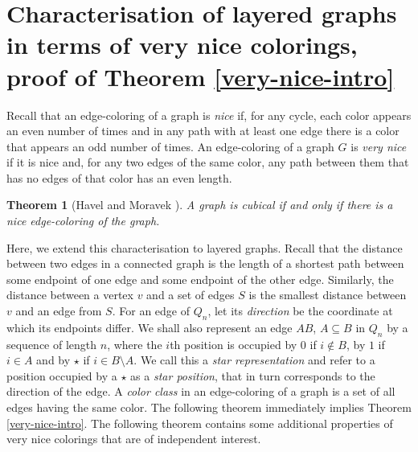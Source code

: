 \documentclass[11pt, a4paper]{article}
\newtheorem{theorem}{Theorem}
\begin{document}
\vskip 1cm




\section{Characterisation of layered graphs in terms of very nice colorings, proof of Theorem \ref{very-nice-intro}}\label{colorings}

	Recall that  an edge-coloring of a graph is {\it nice} if, for any cycle, each color appears an even number of times and in any path with at least one edge there is a color that appears an  odd number of times. An edge-coloring of a graph $G$ is {\it very nice} if  it is nice and, for any two edges of the same color, any path between them that has no edges of that color has an even length. 
	
	\begin{theorem}[Havel and Moravek \cite{HM}]
	A graph is cubical if and only if there is a nice edge-coloring of the graph. 
	\end{theorem}
		
		
	Here, we extend this characterisation to layered graphs. Recall that the distance between two edges in a connected graph is the length of a shortest path between some endpoint of one edge and some endpoint of the other edge. Similarly, the distance between a vertex $v$  and a set of edges $S$ is the smallest distance between $v$ and an edge from $S$. For an edge of $Q_n$, let its {\it direction} be the coordinate at which its endpoints differ.  We shall also represent an edge $AB$, $A\subseteq B$ in $Q_n$ by a sequence of length $n$, 
where the $i$th position is occupied by $0$ if $i\notin B$,  by $1$ if $i\in A$ and by $\star$ if $i\in B\setminus A$.  We call this a \textit{star representation} and refer to a position occupied by a $\star$ as a {\it star position}, that in turn corresponds to the direction of the edge.  A {\it color class} in an edge-coloring of a graph is a set of all edges having the same color. The following theorem immediately implies Theorem \ref{very-nice-intro}. The following theorem contains some additional properties of very nice colorings that are of independent interest.
	
\end{document}
